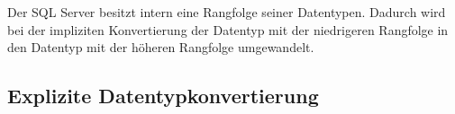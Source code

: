         \begin{merke}
            Der SQL Server besitzt intern eine Rangfolge seiner Datentypen. Dadurch wird bei der impliziten Konvertierung der Datentyp mit der niedrigeren Rangfolge in den Datentyp mit der höheren Rangfolge umgewandelt.
        \end{merke}
        \begin{literaturinternet}
          \item \cite{autoId8}
          \item \cite{ms191530}
          \item \cite{ms190309}
        \end{literaturinternet}
      \subsection{Explizite Datentypkonvertierung}
